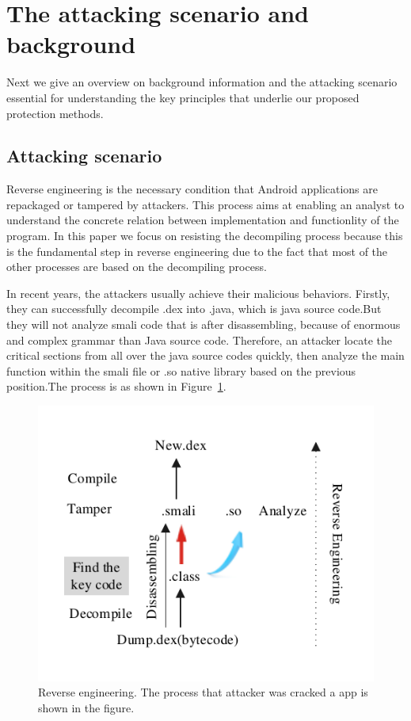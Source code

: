 \section{The attacking scenario and background}
Next we give an overview on background information and the attacking scenario essential for understanding the key principles that underlie our proposed protection methods.

\subsection{Attacking scenario}
Reverse engineering is the necessary condition that Android applications are repackaged or tampered by attackers. This process aims at enabling an analyst to understand the concrete relation between implementation and functionlity of the program. In this paper we focus on resisting the decompiling process because this is the fundamental step in reverse engineering due to the fact that most of the other processes are based on the decompiling process.

In recent years, the attackers usually achieve their malicious behaviors. Firstly, they can successfully decompile .dex into .java, which is java source code.But they will not analyze smali code that is after disassembling, because of enormous and complex grammar than Java source code. Therefore, an attacker locate the critical sections from all over the java source codes quickly, then analyze the main function within the smali file\cite{04} or .so native library based on the previous position.The process is as shown in Figure~\ref{fig:Figure 2}.


\begin{figure}[!tbp]
  \centering
  \includegraphics[width=0.8\columnwidth]{fig/fig2.pdf}
  \caption{Reverse engineering. The process that attacker was cracked a app is shown in the figure. }\label{fig:Figure 2}
\end{figure}

